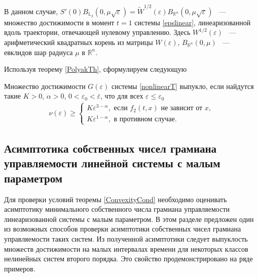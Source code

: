 \documentclass[../main.tex]{subfiles}
\begin{document}
   В данном случае, $S'(0)B_{\mathbb{L}_2}(0,\mu\sqrt{\varepsilon}) = \widetilde{W}^{1/2}(\varepsilon)B_{\mathbb{R}^n}(0,\mu\sqrt{\varepsilon}) $ ~--- множество достижимости в момент $t = 1$ системы \eqref{epslinear}, линеаризованной вдоль траектории, отвечающей нулевому управлению. Здесь $W^{1/2}(\varepsilon)$ ~--- арифметический квадратных корень из матрицы $W(\varepsilon)$, $ B_{\mathbb{R}^n}(0,\mu) $ ~--- евклидов шар радиуса $ \mu $ в $ \mathbb{R}^n $.
 
 Используя теорему \ref{PolyakTh}, сформулируем следующую
 \begin{theorem}\label{ConvexityCond}
 	Множество достижимости $G(\varepsilon)$ системы \eqref{nonlinearT} выпукло, если найдутся такие $K > 0$, $ \alpha > 0$, $ 0 < \varepsilon_0 < \bar{\varepsilon}$, что для всех $\varepsilon \leqslant \varepsilon_0$
 		\begin{gather}\label{cond}
 			\nu(\varepsilon) \geqslant \left\{ {\begin{array}{*{20}{l}}
 					{K\varepsilon ^{3 - \alpha}, \mbox{\ если \ } f_2(t,x) \mbox{\ не зависит от \ } x}, \\
 					{K\varepsilon ^{1 - \alpha}}, \mbox{\ в противном случае}.
 			\end{array}} \right.
 		\end{gather}
 \end{theorem}
 \subsection{Асимптотика собственных чисел грамиана управляемости линейной системы с малым параметром} 
 Для проверки условий теоремы \ref{ConvexityCond} необходимо оценивать асимптотику минимального собственного числа грамиана управляемости линеаризованной системы с малым параметром. В этом разделе предложен один из возможных способов проверки асимптотики собственных чисел грамиана управляемости таких систем. Из полученной асимптотики следует выпуклость множеств достижимости на малых интервалах времени для некоторых классов нелинейных систем второго порядка. Это свойство продемонстрировано на ряде примеров.
\end{document}
